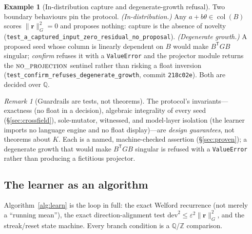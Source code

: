 \documentclass[11pt]{article}
\theoremstyle{plain}
\theoremstyle{definition}
\newtheorem{example}[theorem]{Example}
\theoremstyle{remark}
\newtheorem{remark}[theorem]{Remark}
\newcommand{\Q}{\mathbb{Q}}
\newcommand{\Z}{\mathbb{Z}}
\newcommand{\K}{K}
\newcommand{\rr}{\mathbf{r}}
\newcommand{\GG}{G}
\newcommand{\BB}{B}
\newcommand{\transpose}{^{\mathsf{T}}}
\DeclareMathOperator{\col}{col}
\begin{document}
\begin{example}[In-distribution capture and degenerate-growth refusal]\label{ex:guards}
Two boundary behaviours pin the protocol. \emph{(In-distribution.)} Any $a+b\theta\in\col(\BB)$ scores
$\lVert\rr\rVert_\GG^2=0$ and proposes nothing: capture is the absence of novelty
(\texttt{test\_a\_captured\_input\_zero\_residual\_no\_proposal}). \emph{(Degenerate growth.)} A proposed seed
whose column is linearly dependent on $\BB$ would make $\BB\transpose\GG\BB$ singular; \emph{confirm} refuses
it with a \texttt{ValueError} and the projector module returns the $\textsc{no\_projection}$ sentinel rather
than risking a float inversion (\texttt{test\_confirm\_refuses\_degenerate\_growth}, commit \texttt{218c02e}).
Both are decided over $\Q$.
\end{example}

\begin{remark}[Guardrails are tests, not theorems]\label{rem:guardrails}
The protocol's invariants---exactness (no float in a decision), algebraic integrality of every seed
(\S\ref{sec:crossfield}), sole-mutator, witnessed, and model-layer isolation (the learner imports no language
engine and no float display)---are \emph{design guarantees}, not theorems about $\K$. Each is a named,
machine-checked assertion (\S\ref{sec:proven}); a degenerate growth that would make $\BB\transpose\GG\BB$
singular is refused with a \texttt{ValueError} rather than producing a fictitious projector.
\end{remark}

\subsection{The learner as an algorithm}\label{subsec:alg}
Algorithm~\ref{alg:learn} is the loop in full: the exact Welford recurrence (not merely a ``running mean''),
the exact direction-alignment test $\mathrm{dev}^2\le\varepsilon^2\lVert\rr\rVert_\GG^2$, and the streak/reset
state machine. Every branch condition is a $\Q$/$\Z$ comparison.
\end{document}
